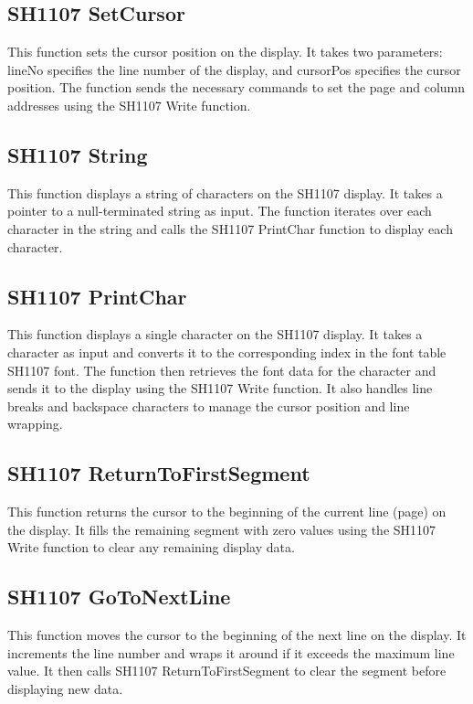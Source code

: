 \subsection{SH1107 SetCursor}
This function sets the cursor position on the display. It takes two parameters: lineNo specifies the line number of the display, and cursorPos specifies the cursor position. The function sends the necessary commands to set the page and column addresses using the SH1107 Write function.

\subsection{SH1107 String}
This function displays a string of characters on the SH1107 display. It takes a pointer to a null-terminated string as input. The function iterates over each character in the string and calls the SH1107 PrintChar function to display each character.

\subsection{SH1107 PrintChar}
This function displays a single character on the SH1107 display. It takes a character as input and converts it to the corresponding index in the font table SH1107 font. The function then retrieves the font data for the character and sends it to the display using the SH1107 Write function. It also handles line breaks and backspace characters to manage the cursor position and line wrapping.

\subsection{SH1107 ReturnToFirstSegment}
This function returns the cursor to the beginning of the current line (page) on the display. It fills the remaining segment with zero values using the SH1107 Write function to clear any remaining display data.

\subsection{SH1107 GoToNextLine}
This function moves the cursor to the beginning of the next line on the display. It increments the line number and wraps it around if it exceeds the maximum line value. It then calls SH1107 ReturnToFirstSegment to clear the segment before displaying new data.